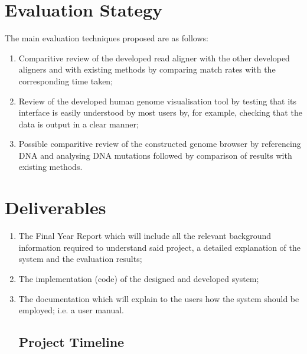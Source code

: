 \documentclass{csfyp}
\begin{document}
{{\section{Evaluation Stategy}\vspace{-2ex}

The main evaluation techniques proposed are as follows:

\begin{enumerate}[nolistsep]

  \item	Comparitive review of the developed read aligner with the other developed aligners and with existing methods by comparing match rates with the corresponding time taken;

  \item Review of the developed human genome visualisation tool by testing that its interface is easily understood by most users by, for example, checking that the data is output in a clear manner;

  \item Possible comparitive review of the constructed genome browser by referencing DNA and analysing DNA mutations followed by comparison of results with existing methods.

\end{enumerate}


\section{Deliverables}\vspace{-2ex}

\begin{enumerate}[nolistsep]

  \item The Final Year Report which will include all the relevant background information required to understand said project, a detailed explanation of the system and the evaluation results; 

  \item The implementation (code) of the designed and developed system;

  \item The documentation which will explain to the users how the system should be employed; i.e. a user manual. 

\subsection{Project Timeline}\vspace{-2ex}


\end{enumerate}}}
\end{document}

